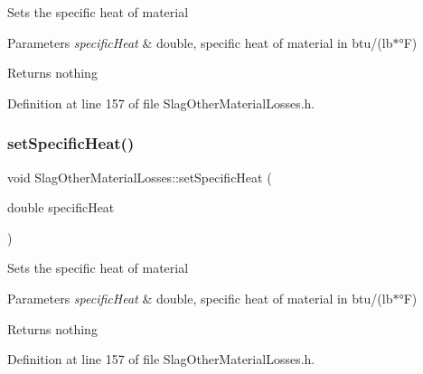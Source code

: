 Sets the specific heat of material


\begin{DoxyParams}{Parameters}
{\em specific\+Heat} & double, specific heat of material in btu/(lb$\ast$°F)\\
\hline
\end{DoxyParams}
\begin{DoxyReturn}{Returns}
nothing 
\end{DoxyReturn}


Definition at line 157 of file Slag\+Other\+Material\+Losses.\+h.

\mbox{\label{class_slag_other_material_losses_a05488997f264a74afe3229250a286f92}} 
\subsubsection{\texorpdfstring{set\+Specific\+Heat()}{setSpecificHeat()}\hspace{0.1cm}{\footnotesize\ttfamily [3/3]}}
{\footnotesize\ttfamily void Slag\+Other\+Material\+Losses\+::set\+Specific\+Heat (\begin{DoxyParamCaption}\item[{double}]{specific\+Heat }\end{DoxyParamCaption})\hspace{0.3cm}{\ttfamily [inline]}}

Sets the specific heat of material


\begin{DoxyParams}{Parameters}
{\em specific\+Heat} & double, specific heat of material in btu/(lb$\ast$°F)\\
\hline
\end{DoxyParams}
\begin{DoxyReturn}{Returns}
nothing 
\end{DoxyReturn}


Definition at line 157 of file Slag\+Other\+Material\+Losses.\+h.

\mbox{\label{class_slag_other_material_losses_a230a178f2ead59cd498b620e4bb4910f}} 
